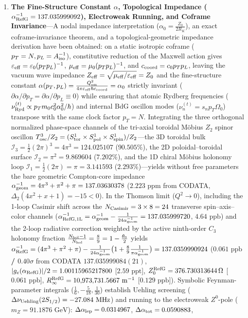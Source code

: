 \documentclass[11pt,a4paper]{article}
\begin{document}
\begin{enumerate}[label=\arabic*.]
\item \textbf{The Fine-Structure Constant $\alpha$, Topological Impedance ($\alpha_{\rm RefG}^{-1} = \allowbreak 137.035999092$), Electroweak Running, and Coframe Invariance}---A nodal impedance interpretation ($\alpha_0 = \frac{Z_0}{2 R_K}$), an exact coframe-invariance theorem, and a topological-geometric impedance derivation have been obtained: on a static isotropic coframe ($p_T = N, p_L = A_{\rm iso}^{-1}$), constitutive reduction of the Maxwell action gives $\varepsilon_{\rm eff} = \varepsilon_0(p_T p_L)^{-1}$, $\mu_{\rm eff} = \mu_0(p_T p_L)^{-1}$, and $c_{\rm coord} = c_0 p_T p_L$, leaving the vacuum wave impedance $Z_{\rm eff} = \sqrt{\mu_{\rm eff}/\varepsilon_{\rm eff}} = Z_0$ and the fine-structure constant $\alpha(p_T, p_L) = \frac{Q_{\rm em}^2}{4\pi\varepsilon_{\rm eff}\hbar c_{\rm coord}} = \alpha_0$ strictly invariant ($\partial\alpha/\partial p_T = \partial\alpha/\partial p_L \equiv 0$) while ensuring that atomic Rydberg frequencies ($\nu_{\rm Ryd}^{(t)} \propto p_T m_0 c_0^2\alpha_0^2/\hbar$) and internal BdG oscillon modes ($\nu_n^{(t)} = s_n p_T\Omega_0$) transpose with the same clock factor $p_T = N$. Integrating the three orthogonal normalized phase-space channels of the tri-axial toroidal Möbius $Z_2$ spinor oscillon $T^3_{\rm osc}/Z_2 = \allowbreak (S^1_{\rm tor}\times S^1_{\rm pol}\times S^1_{\rm spin})/Z_2$---the 3D toroidal bulk $\mathcal{I}_3 = \frac{1}{2}(2\pi)^3 = 4\pi^3 = \allowbreak 124.025107$ ($90.505\%$), the 2D poloidal--toroidal surface $\mathcal{I}_2 = \pi^2 = 9.869604$ ($7.202\%$), and the 1D chiral Möbius holonomy loop $\mathcal{I}_1 = \frac{1}{2}(2\pi) = \pi = 3.141593$ ($2.293\%$)---yields without free parameters the bare geometric Compton-core impedance \textbf{$\alpha_{\rm geom}^{-1} = \allowbreak 4\pi^3 + \pi^2 + \pi = \allowbreak 137.03630378$} ($2.223\text{ ppm}$ from CODATA, $\Delta_2(4x^2+x+1) = -15 < 0$). In the Thomson limit ($Q^2 \to 0$), including the 1-loop Casimir shift across the $N_{\rm Casimir} = 3\times 8 = 24$ transverse spin--axis--color channels ($\alpha_{\rm RefG,1L}^{-1} = \allowbreak \alpha_{\rm geom}^{-1} - \frac{1}{24\alpha_{\rm geom}^{-1}} = \allowbreak 137.035999720$, $4.64\text{ ppb}$) and the 2-loop radiative correction weighted by the active ninth-order $C_3$ holonomy fraction $\frac{N_{\rm hol}-1}{N_{\rm hol}} = \frac{8}{9} = 1 - \frac{\theta_0}{2}$ yields \textbf{$\alpha_{\rm RefG}^{-1} = \allowbreak (4\pi^3 + \pi^2 + \pi) - \allowbreak \frac{1}{24\alpha_{\rm geom}^{-1}}\bigl(1 + \frac{8}{9}\frac{1}{\pi\alpha_{\rm geom}^{-1}}\bigr) = \allowbreak 137.0359990924$} (\textbf{$0.061\text{ ppb}$ / $0.40\sigma$} from CODATA $137.035999084(21)$, $|g_e(\alpha_{\rm RefG})|/2 = \allowbreak 1.00115965217800$ [$2.59\text{ ppt}$], $Z_0^{\rm RefG} = \allowbreak 376.730313644\,\Omega$ [$0.061\text{ ppb}$], $R_\infty^{\rm RefG} = \allowbreak 10{,}973{,}731.5667\text{ m}^{-1}$ [$0.129\text{ ppb}$]). Symbolic Feynman-parameter integrals ($\frac{1}{6}, -\frac{5}{18}, \frac{1}{30}$) establish Uehling screening ($\Delta\nu_{\rm Uehling}(2S_{1/2}) = -27.084\text{ MHz}$) and running to the electroweak $Z^0$-pole ($m_Z = 91.1876\text{ GeV}$): $\Delta\alpha_{\rm lep} = 0.0314967$, $\Delta\alpha_{\rm tot} = 0.0590883$, 
\end{enumerate}
\end{document}
